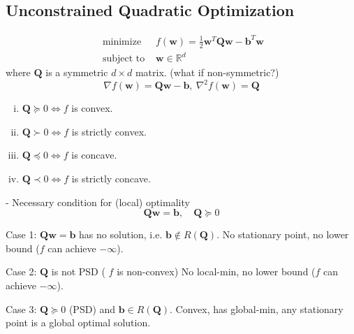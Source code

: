 \documentclass[11pt,a4paper]{article}
\begin{document}
\subsection{Unconstrained Quadratic Optimization}
$$\begin{array}{ll}\text { minimize } & f(\mathbf{w})=\frac{1}{2} \mathbf{w}^{T} \mathbf{Q} \mathbf{w}-\mathbf{b}^{T} \mathbf{w} \\ \text { subject to } & \mathbf{w} \in \mathbb{R}^{d}\end{array}$$
where $\mathbf{Q}$ is a symmetric $d \times d$ matrix. (what if non-symmetric?)
$$\nabla f(\mathbf{w})=\mathbf{Q}\mathbf{w}-\mathbf{b},\ \nabla^2 f(\mathbf{w})=\mathbf{Q}$$
\begin{enumerate}[(i)]
    \item $\mathbf{Q}\succeq 0 \Leftrightarrow	f$ is convex.
    \item $\mathbf{Q}\succ 0 \Leftrightarrow	f$ is strictly convex.
    \item $\mathbf{Q}\preceq 0 \Leftrightarrow	f$ is concave.
    \item $\mathbf{Q}\prec 0 \Leftrightarrow	f$ is strictly concave.
\end{enumerate}









- Necessary condition for (local) optimality
$$
\mathbf{Q} \mathbf{w}=\mathbf{b}, \quad \mathbf{Q} \succeq 0
$$

Case 1: $\mathbf{Q w}=\mathbf{b}$ has no solution, i.e. $\mathbf{b} \notin R(\mathbf{Q})$. No stationary point, no lower bound ($f$ can achieve $-\infty$).

Case 2: $\mathbf{Q}$ is not PSD ( $f$ is non-convex)
No local-min, no lower bound ($f$ can achieve $-\infty$).

Case 3: $\mathbf{Q} \succeq 0$ (PSD) and $\mathbf{b} \in R(\mathbf{Q})$. Convex, has global-min, 
any stationary point is a global optimal solution.
\end{document}
